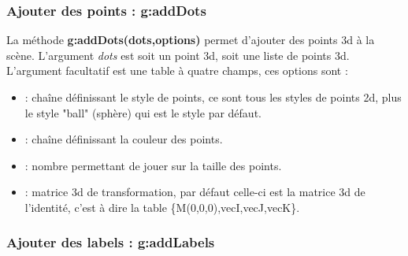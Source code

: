 \subsubsection{Ajouter des points : g:addDots}

La méthode \textbf{g:addDots(dots,options)} permet d'ajouter des points 3d à la scène. L'argument \emph{dots} est soit un point 3d, soit une liste de points 3d. L'argument facultatif  est une table à quatre champs, ces options sont :
\begin{itemize}
        \item {} : chaîne définissant le style de points, ce sont tous les styles de points 2d, plus le style "ball" (sphère) qui est le style par défaut. 
    \item {} : chaîne définissant la couleur des points.
    \item {} : nombre permettant de jouer sur la taille des points.
    \item {} : matrice 3d de transformation, par défaut celle-ci est la matrice 3d de l'identité, c'est à dire la table \{M(0,0,0),vecI,vecJ,vecK\}.
\end{itemize}

\subsubsection{Ajouter des labels : g:addLabels}

